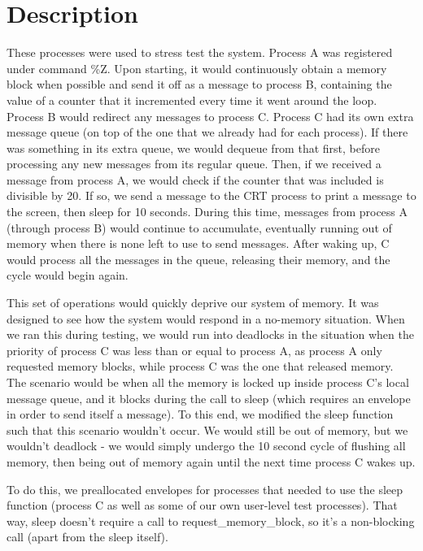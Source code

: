 \documentclass[12pt]{report}
\begin{document}
\section{Description}
    These processes were used to stress test the system.  Process A was
    registered under command \%Z.  Upon starting, it would continuously obtain
    a memory block when possible and send it off as a message to process B,
    containing the value of a counter that it incremented every time it went
    around the loop.  Process B would redirect any messages to process C.
    Process C had its own extra message queue (on top of the one that we already
    had for each process).  If there was something in its extra queue, we would
    dequeue from that first, before processing any new messages from its regular
    queue.  Then, if we received a message from process A, we would check if the
    counter that was included is divisible by 20.  If so, we send a message to
    the CRT process to print a message to the screen, then sleep for 10 seconds.
    During this time, messages from process A (through process B) would continue
    to accumulate, eventually running out of memory when there is none left to
    use to send messages.  After waking up, C would process all the messages in
    the queue, releasing their memory, and the cycle would begin again.

    This set of operations would quickly deprive our system of memory.  It was
    designed to see how the system would respond in a no-memory situation.  When
    we ran this during testing, we would run into deadlocks in the situation
    when the priority of process C was less than or equal to process A, as
    process A only requested memory blocks, while process C was the one that
    released memory.  The scenario would be when all the memory is locked up
    inside process C's local message queue, and it blocks during the call to
    sleep (which requires an envelope in order to send itself a message).  To
    this end, we modified the sleep function such that this scenario wouldn't
    occur.  We would still be out of memory, but we wouldn't deadlock - we
    would simply undergo the 10 second cycle of flushing all memory, then being
    out of memory again until the next time process C wakes up.

    To do this, we preallocated envelopes for processes that needed to use the
    sleep function (process C as well as some of our own user-level test
    processes).  That way, sleep doesn't require a call to
    request\_memory\_block, so it's a non-blocking call (apart from the sleep
    itself).
\end{document}
